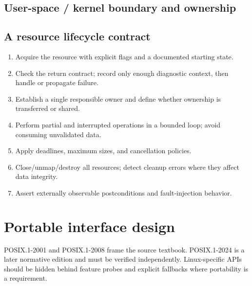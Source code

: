 \documentclass[11pt,letterpaper,oneside]{report}
\begin{document}
\section{User-space / kernel boundary and ownership}
\begin{center}
\end{center}
\section{A resource lifecycle contract}
\begin{enumerate}
\item Acquire the resource with explicit flags and a documented starting state.
\item Check the return contract; record only enough diagnostic context, then handle or propagate failure.
\item Establish a single responsible owner and define whether ownership is transferred or shared.
\item Perform partial and interrupted operations in a bounded loop; avoid consuming unvalidated data.
\item Apply deadlines, maximum sizes, and cancellation policies.
\item Close/unmap/destroy all resources; detect cleanup errors where they affect data integrity.
\item Assert externally observable postconditions and fault-injection behavior.
\end{enumerate}
\chapter{Portable interface design}
POSIX.1-2001 and POSIX.1-2008 frame the source textbook. POSIX.1-2024 is a later normative edition and must be verified independently. Linux-specific APIs should be hidden behind feature probes and explicit fallbacks where portability is a requirement.
\end{document}
